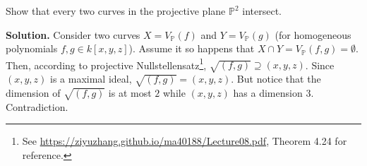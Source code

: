 \documentclass{template}
\begin{document}
\begin{problem}[Exercise 5]
    Show that every two curves in the projective plane $\mathbb{P}^2$ intersect.
\end{problem}

\textbf{Solution.} Consider two curves $X = V_{\mathbb{P}}(f)$ and $Y =
V_{\mathbb{P}}(g)$ (for homogeneous polynomials $f,g \in k[x,y,z]$). Assume it
so happens that $X \cap Y = V_{\mathbb{P}}(f,g) = \emptyset$. Then, according to
projective Nullstellensatz\footnote{See
\url{https://ziyuzhang.github.io/ma40188/Lecture08.pdf}, Theorem 4.24 for
reference.}, $\sqrt{(f,g)} \supseteq (x,y,z)$. Since $(x,y,z)$ is a maximal
ideal, $\sqrt{(f,g)} = (x,y,z)$. But notice that the dimension of $\sqrt{(f,g)}$
is at most $2$ while $(x,y,z)$ has a dimension $3$. Contradiction.
\end{document}
